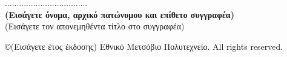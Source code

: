 \documentclass[12pt, twoside, a4paper]{report}
\begin{document}
\noindent
................................... \\
\textbf{(Εισάγετε όνομα, αρχικό πατώνυμου και επίθετο συγγραφέα)} \\
(Εισάγετε τον απονεμηθέντα τίτλο στο συγγραφέα) \\
\vspace{26ex}

\newpage
\tableofcontents
\listoffigures
\listoftables

% 
% 
% 




\newpage
\small
\noindent
{}  %
\copyright \hspace{1em}(Εισάγετε έτος έκδοσης) Εθνικό Μετσόβιο Πολυτεχνείο.
\textlatin{All rights reserved.}

\newpage
{}  %
\printindex  %
\nocite{*}
\end{document}
